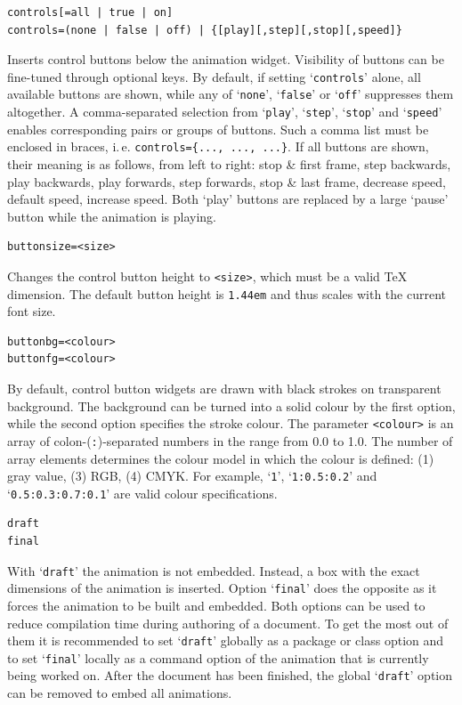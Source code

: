\documentclass[a4paper]{article}
\begin{document}
\begin{verbatim}
controls[=all | true | on]
controls=(none | false | off) | {[play][,step][,stop][,speed]}
\end{verbatim}
Inserts control buttons below the animation widget. Visibility of buttons can be fine-tuned through optional keys. By default, if setting `\verb+controls+' alone, all available buttons are shown, while any of `\verb+none+', `\verb+false+' or `\verb+off+' suppresses them altogether. A comma-separated selection from `\verb+play+', `\verb+step+', `\verb+stop+' and `\verb+speed+' enables corresponding pairs or groups of buttons. Such a comma list must be enclosed in braces, i.\,e. \verb+controls={..., ..., ...}+. If all buttons are shown, their meaning is as follows, from left to right: stop \& first frame, step backwards, play backwards, play forwards, step forwards, stop \& last frame, decrease speed, default speed, increase speed. Both `play' buttons are replaced by a large `pause' button while the animation is playing.
\begin{verbatim}
buttonsize=<size>
\end{verbatim}
Changes the control button height to \verb+<size>+, which must be a valid \TeX{} dimension. The default button height is \verb+1.44em+ and thus scales with the current font size.
\begin{verbatim}
buttonbg=<colour>
buttonfg=<colour>
\end{verbatim}
By default, control button widgets are drawn with black strokes on transparent background. The background can be turned into a solid colour by the first option, while the second option specifies the stroke colour. The parameter \verb+<colour>+ is an array of colon-(\verb+:+)-separated numbers in the range from 0.0 to 1.0. The number of array elements determines the colour model in which the colour is defined: (1) gray value, (3) RGB, (4) CMYK. For example, `\verb+1+', `\verb+1:0.5:0.2+' and `\verb+0.5:0.3:0.7:0.1+' are valid colour specifications.
\begin{verbatim}
draft
final
\end{verbatim}
With `\verb+draft+' the animation is not embedded. Instead, a box with the exact dimensions of the animation is inserted. Option `\verb+final+' does the opposite as it forces the animation to be built and embedded. Both options can be used to reduce compilation time during authoring of a document. To get the most out of them it is recommended to set `\verb+draft+' globally as a package or class option and to set `\verb+final+' locally as a command option of the animation that is currently being worked on. After the document has been finished, the global `\verb+draft+' option can be removed to embed all animations.
\end{document}
